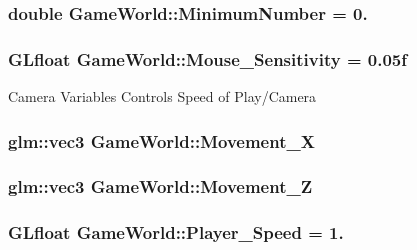 \subsubsection[{Minimum\+Number}]{\setlength{\rightskip}{0pt plus 5cm}double Game\+World\+::\+Minimum\+Number = 0.}\label{classGameWorld_a54ccf4cf03172ab8779e9c326c8846ed}
\hypertarget{classGameWorld_a9bf4eb977e6ab9299aaef1345c4fa4dd}{}
\subsubsection[{Mouse\+\_\+\+Sensitivity}]{\setlength{\rightskip}{0pt plus 5cm}G\+Lfloat Game\+World\+::\+Mouse\+\_\+\+Sensitivity = 0.\+05f}\label{classGameWorld_a9bf4eb977e6ab9299aaef1345c4fa4dd}
Camera Variables Controls Speed of Play/\+Camera \hypertarget{classGameWorld_a968eb29424b68f7cd79a5896c62e944d}{}
\subsubsection[{Movement\+\_\+\+X}]{\setlength{\rightskip}{0pt plus 5cm}glm\+::vec3 Game\+World\+::\+Movement\+\_\+\+X}\label{classGameWorld_a968eb29424b68f7cd79a5896c62e944d}
\hypertarget{classGameWorld_a8dd30ba92e7fa9b9b05075e31d1e7dd8}{}
\subsubsection[{Movement\+\_\+\+Z}]{\setlength{\rightskip}{0pt plus 5cm}glm\+::vec3 Game\+World\+::\+Movement\+\_\+\+Z}\label{classGameWorld_a8dd30ba92e7fa9b9b05075e31d1e7dd8}
\hypertarget{classGameWorld_ae8ab2ac372729cec44ea316f6bdf45ca}{}
\subsubsection[{Player\+\_\+\+Speed}]{\setlength{\rightskip}{0pt plus 5cm}G\+Lfloat Game\+World\+::\+Player\+\_\+\+Speed = 1.}\label{classGameWorld_ae8ab2ac372729cec44ea316f6bdf45ca}
\hypertarget{classGameWorld_a56652cc9880b3ba1be61395066c863c3}{}
